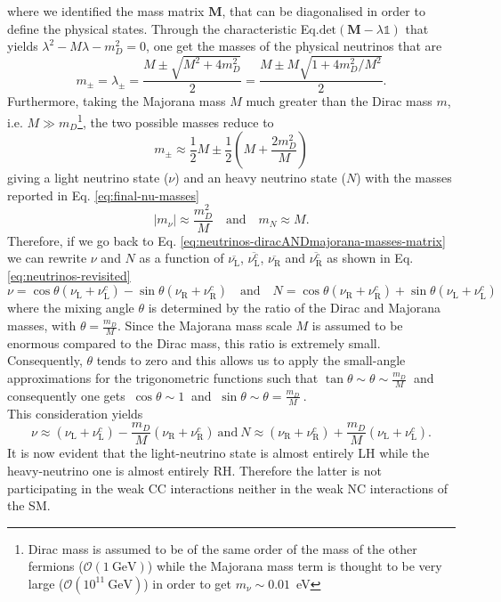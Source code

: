 where we identified the mass matrix $\mathbf{M}$, that can be diagonalised in order to define the physical states. 
Through the characteristic Eq.$\text{det}(\mathbf{M} - \lambda \mathbb{1})$ that yields $\lambda^2 - M\lambda - m_D^2 = 0$, 
one get the masses of the physical neutrinos that are 
\begin{equation*}
    m_{\pm} = \lambda_{\pm} = \frac{M \pm \sqrt{M^2 + 4m_D^2}}{2} = \frac{M \pm M\sqrt{1 + 4m_D^2/M^2}}{2}.
\end{equation*}
Furthermore, taking the Majorana mass $M$ much greater than the Dirac mass $m$, 
i.e. $M \gg m_D$\footnote{Dirac mass is assumed to be of the same order of the mass of the other fermions ($\mathcal{O}(1~\text{GeV})$) 
while the Majorana mass term is thought to be very large ($\mathcal{O}(10^{11}~\text{GeV})$) in order to get $m_\nu \sim 0.01$~eV}, 
the two possible masses reduce to 
\begin{equation*}
    m_{\pm} \approx \frac{1}{2}M \pm \frac{1}{2}\left( M + \frac{2m_D^2}{M} \right)
\end{equation*}
giving a light neutrino state ($\nu$) and an heavy neutrino state ($N$) with the masses reported in Eq. \ref{eq:final-nu-masses}
\begin{equation}
    \label{eq:final-nu-masses}
    |m_{\nu}| \approx \frac{m_D^2}{M} \quad \text{and} \quad m_N \approx M.
\end{equation} 
Therefore, if we go back to Eq. \ref{eq:neutrinos-diracANDmajorana-masses-matrix} we can rewrite $\nu$ and $N$ as a function of
$\overline{\nu_\text{L}}$, $\overline{\nu_\text{L}^c}$, $\overline{\nu_\text{R}}$ and $\overline{\nu_\text{R}^c}$ as shown in Eq. \ref{eq:neutrinos-revisited}
\begin{equation}
    \label{eq:neutrinos-revisited}
    \nu = \cos\theta (\nu_\text{L} + \nu_\text{L}^c) - \sin\theta (\nu_\text{R} + \nu_\text{R}^c) \quad \text{and} \quad N = \cos\theta (\nu_\text{R} + \nu_\text{R}^c) + \sin\theta (\nu_\text{L} + \nu_\text{L}^c)
\end{equation}
where the mixing angle $\theta$ is determined by the ratio of the Dirac and Majorana masses, with $\theta = \frac{m_D}{M}$. 
Since the Majorana mass scale $M$ is assumed to be enormous compared to the Dirac mass, this ratio is extremely small. 
Consequently, $\theta$ tends to zero and this allows us to apply the small-angle approximations for the trigonometric functions such that
$\tan\theta \sim \theta \sim \frac{m_D}{M}~$ and consequently one gets $~\cos\theta \sim 1~$ and $~\sin\theta \sim \theta = \frac{m_D}{M}~$.\\
This consideration yields
\begin{equation*}
    \nu \approx (\nu_\text{L} + \nu_\text{L}^c) - \frac{m_D}{M}(\nu_\text{R} + \nu_\text{R}^c) ~ \text{and} ~ N \approx (\nu_\text{R} + \nu_\text{R}^c) + \frac{m_D}{M}(\nu_\text{L} + \nu_\text{L}^c).
\end{equation*}
It is now evident that the light-neutrino state is almost entirely \ac{LH} while the heavy-neutrino one is almost entirely \ac{RH}. 
Therefore the latter is not participating in the weak \ac{CC} interactions neither in the weak \ac{NC} interactions of the \ac{SM}.

